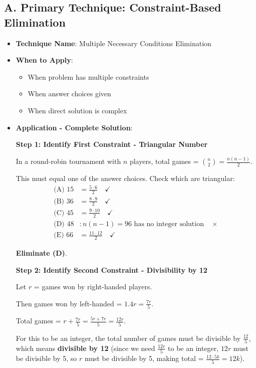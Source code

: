 \documentclass[12pt]{article}
\begin{document}
\begin{techniquesbox}
\subsection*{A. Primary Technique: Constraint-Based Elimination}
\begin{itemize}[leftmargin=*]
    \item \textbf{Technique Name}: Multiple Necessary Conditions Elimination
    \item \textbf{When to Apply}: 
    \begin{itemize}
        \item When problem has multiple constraints
        \item When answer choices given
        \item When direct solution is complex
    \end{itemize}
    \item \textbf{Application - Complete Solution}: 
    
    \textbf{Step 1: Identify First Constraint - Triangular Number}
    
    In a round-robin tournament with $n$ players, total games = $\binom{n}{2} = \frac{n(n-1)}{2}$.
    
    This must equal one of the answer choices. Check which are triangular:
    \begin{align*}
    \text{(A) } 15 &= \frac{5 \cdot 6}{2} \quad \checkmark\\
    \text{(B) } 36 &= \frac{8 \cdot 9}{2} \quad \checkmark\\
    \text{(C) } 45 &= \frac{9 \cdot 10}{2} \quad \checkmark\\
    \text{(D) } 48 &: n(n-1) = 96 \text{ has no integer solution} \quad \times\\
    \text{(E) } 66 &= \frac{11 \cdot 12}{2} \quad \checkmark
    \end{align*}
    
    \textbf{Eliminate (D)}.
    
    \textbf{Step 2: Identify Second Constraint - Divisibility by 12}
    
    Let $r$ = games won by right-handed players.
    
    Then games won by left-handed = $1.4r = \frac{7r}{5}$.
    
    Total games = $r + \frac{7r}{5} = \frac{5r + 7r}{5} = \frac{12r}{5}$.
    
    For this to be an integer, the total number of games must be divisible by $\frac{12}{5}$, which means \textbf{divisible by 12} (since we need $\frac{12r}{5}$ to be an integer, $12r$ must be divisible by 5, so $r$ must be divisible by 5, making total = $\frac{12 \cdot 5k}{5} = 12k$).
    

\end{itemize}
\end{techniquesbox}
\end{document}
